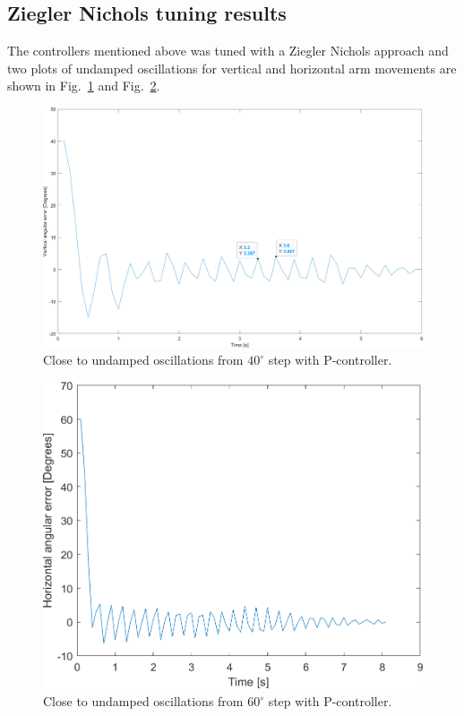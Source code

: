 \subsection{Ziegler Nichols tuning results}
\label{sec:simon17}
The controllers mentioned above was tuned with a Ziegler Nichols approach and two plots of undamped oscillations for vertical and horizontal arm movements are shown in  Fig.~\ref{vert_osc} and Fig.~\ref{Hor_osc}.
\begin{figure}[h]
\centering
\includegraphics[width=\linewidth]{sections/assets/Vertical_undamped_oscillation.png}
\caption{Close to undamped oscillations from \(40^{\circ}\) step with P-controller.}
\label{vert_osc}
\end{figure}
\begin{figure}[h]
\centering
\includegraphics[width=\linewidth]{sections/assets/Horizontal_undamped_oscillation.png}
\caption{Close to undamped oscillations from \(60^{\circ}\) step with P-controller.}
\label{Hor_osc}
\end{figure}
